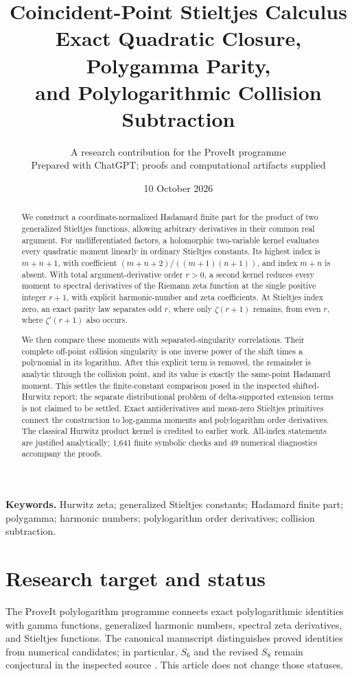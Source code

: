\documentclass[11pt,a4paper]{article}
\title{\textbf{Coincident-Point Stieltjes Calculus}\\[5pt]
\large Exact Quadratic Closure, Polygamma Parity,\\
and Polylogarithmic Collision Subtraction}
\author{A research contribution for the ProveIt programme\\
\small Prepared with ChatGPT; proofs and computational artifacts supplied}
\date{10 October 2026}
\numberwithin{equation}{section}
\theoremstyle{definition}
\begin{document}
\maketitle
\begin{abstract}
We construct a coordinate-normalized Hadamard finite part for the product of two generalized Stieltjes functions, allowing arbitrary derivatives in their common real argument. For undifferentiated factors, a holomorphic two-variable kernel evaluates every quadratic moment linearly in ordinary Stieltjes constants. Its highest index is $m+n+1$, with coefficient $(m+n+2)/((m+1)(n+1))$, and index $m+n$ is absent. With total argument-derivative order $r>0$, a second kernel reduces every moment to spectral derivatives of the Riemann zeta function at the single positive integer $r+1$, with explicit harmonic-number and zeta coefficients. At Stieltjes index zero, an exact parity law separates odd $r$, where only $\zeta(r+1)$ remains, from even $r$, where $\zeta'(r+1)$ also occurs.

We then compare these moments with separated-singularity correlations. Their complete off-point collision singularity is one inverse power of the shift times a polynomial in its logarithm. After this explicit term is removed, the remainder is analytic through the collision point, and its value is exactly the same-point Hadamard moment. This settles the finite-constant comparison posed in the inspected shifted-Hurwitz report; the separate distributional problem of delta-supported extension terms is not claimed to be settled. Exact antiderivatives and mean-zero Stieltjes primitives connect the construction to log-gamma moments and polylogarithm order derivatives. The classical Hurwitz product kernel is credited to earlier work. All-index statements are justified analytically; 1,641 finite symbolic checks and 49 numerical diagnostics accompany the proofs.
\end{abstract}
\vspace{3pt}
\noindent\textbf{Keywords.} Hurwitz zeta; generalized Stieltjes constants; Hadamard finite part; polygamma; harmonic numbers; polylogarithm order derivatives; collision subtraction.
\newpage
\tableofcontents
\newpage

\section{Research target and status}\label{csc:scope}
The ProveIt polylogarithm programme connects exact polylogarithmic identities with gamma functions, generalized harmonic numbers, spectral zeta derivatives, and Stieltjes functions. The canonical manuscript distinguishes proved identities from numerical candidates; in particular, $S_6$ and the revised $S_8$ remain conjectural in the inspected source \cite{csc:repo}. This article does not change those statuses.
\end{document}
